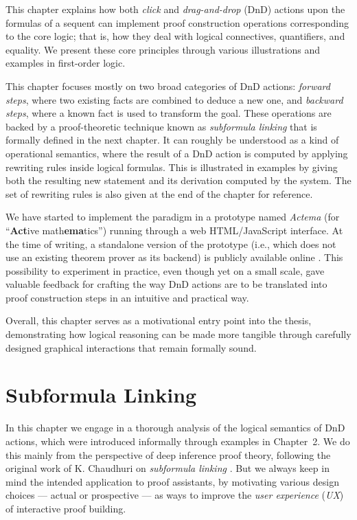 \documentclass[11pt]{article}
\begin{document}
This chapter explains how both \emph{click} and \emph{drag-and-drop} (DnD) actions upon the formulas of
a sequent can implement proof construction operations corresponding to the core logic; that is, how
they deal with logical connectives, quantifiers, and equality. We present these core principles
through various illustrations and examples in first-order logic.

This chapter focuses mostly on two broad categories of DnD actions: \emph{forward steps}, where two
existing facts are combined to deduce a new one, and \emph{backward steps}, where a known fact is
used to transform the goal. These operations are backed by a proof-theoretic technique known as
\emph{subformula linking} that is formally defined in the next chapter. It can roughly be
understood as a kind of operational semantics, where the result of a DnD action is computed by
applying rewriting rules inside logical formulas. This is illustrated in examples by giving both the
resulting new statement and its derivation computed by the system. The set of rewriting rules is
also given at the end of the chapter for reference.

We have started to implement the paradigm in a prototype named \emph{Actema}
(for ``\textbf{Act}ive math\textbf{ema}tics'') running through a web
HTML/JavaScript interface. At the time of writing, a standalone
version of the prototype (i.e., which does not use an existing theorem prover as
its backend) is publicly available online \cite{Actema:link}. This possibility
to experiment in practice, even though yet on a small scale, gave valuable
feedback for crafting the way DnD actions are to be translated into proof
construction steps in an intuitive and practical way.

Overall, this chapter serves as a motivational entry point into the thesis, demonstrating how logical reasoning can be made more tangible through carefully designed graphical interactions that remain formally sound.

\section{Subformula Linking}

In this chapter we engage in a thorough analysis of the logical semantics of
DnD actions, which were introduced informally through examples in Chapter~2.
We do this mainly from the perspective of deep inference proof theory,
following the original work of K. Chaudhuri on \emph{subformula linking}
\cite{Chaudhuri2013}. But we always keep in mind the intended application to
proof assistants, by motivating various design choices --- actual or prospective ---
as ways to improve the \emph{user experience} (\emph{UX}) of interactive proof building.
\end{document}
